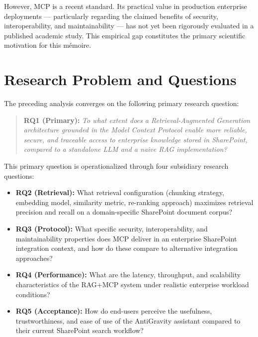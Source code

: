 However, MCP is a recent standard. Its practical value in production enterprise deployments — particularly regarding the claimed benefits of security, interoperability, and maintainability — has not yet been rigorously evaluated in a published academic study. This empirical gap constitutes the primary scientific motivation for this mémoire.

\section{Research Problem and Questions}
\label{sec:intro-problem}

The preceding analysis converges on the following primary research question:

\begin{quote}
\textbf{RQ1 (Primary):} \textit{To what extent does a Retrieval-Augmented Generation architecture grounded in the Model Context Protocol enable more reliable, secure, and traceable access to enterprise knowledge stored in SharePoint, compared to a standalone LLM and a naive RAG implementation?}
\end{quote}

This primary question is operationalized through four subsidiary research questions:

\begin{itemize}
  \item \textbf{RQ2 (Retrieval):} What retrieval configuration (chunking strategy, embedding model, similarity metric, re-ranking approach) maximizes retrieval precision and recall on a domain-specific SharePoint document corpus?

  \item \textbf{RQ3 (Protocol):} What specific security, interoperability, and maintainability properties does MCP deliver in an enterprise SharePoint integration context, and how do these compare to alternative integration approaches?

  \item \textbf{RQ4 (Performance):} What are the latency, throughput, and scalability characteristics of the RAG+MCP system under realistic enterprise workload conditions?

  \item \textbf{RQ5 (Acceptance):} How do end-users perceive the usefulness, trustworthiness, and ease of use of the AntiGravity assistant compared to their current SharePoint search workflow?
\end{itemize}

